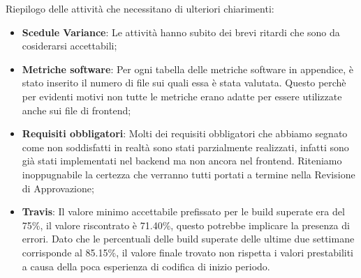 
Riepilogo delle attività che necessitano di ulteriori chiarimenti:
\begin{itemize}
    \item \textbf{Scedule Variance}: Le attività hanno subito dei brevi ritardi che sono da cosiderarsi accettabili;
    \item \textbf{Metriche software}: Per ogni tabella delle metriche software in appendice, è stato inserito 
    il numero di file sui quali essa è stata valutata.
    Questo perchè per evidenti motivi non tutte le metriche erano adatte per essere utilizzate anche 
    sui file di frontend;
    \item \textbf{Requisiti obbligatori}: Molti dei requisiti obbligatori che abbiamo segnato come non 
    soddisfatti in realtà sono stati parzialmente realizzati, infatti sono già stati implementati nel
    backend ma non ancora nel frontend. Riteniamo inoppugnabile la certezza che verranno tutti portati 
    a termine nella Revisione di Approvazione;
    \item \textbf{Travis}: Il valore minimo accettabile prefissato per le build superate era del 75\%, il valore riscontrato
    è 71.40\%, questo potrebbe implicare la presenza di errori. Dato che le percentuali delle
    build superate delle ultime due settimane corrisponde al 85.15\%, il valore finale
    trovato non rispetta i valori prestabiliti a causa della poca esperienza di codifica di inizio periodo.
\end{itemize}
